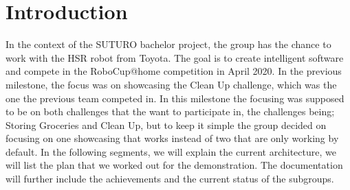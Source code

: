 \documentclass[main.tex]{subfiles}
\begin{document}
	\chapter{Introduction}
	In the context of the SUTURO bachelor project, the group has the chance to work with the HSR robot from Toyota. The goal is to create intelligent software and compete in the RoboCup@home competition in April 2020. 
	In the previous milestone, the focus was on showcasing the Clean Up challenge, which was the one the previous team competed in. In this milestone the focusing was supposed to be on both challenges that the want to participate in, the challenges being; Storing Groceries and Clean Up, but to keep it simple the group decided on focusing on one showcasing that works instead of two that are only working by default.
	In the following segments, we will explain the current architecture, we will list the plan that we worked out for the demonstration. The documentation will further include the achievements and the current status of the subgroups.
\end{document}
